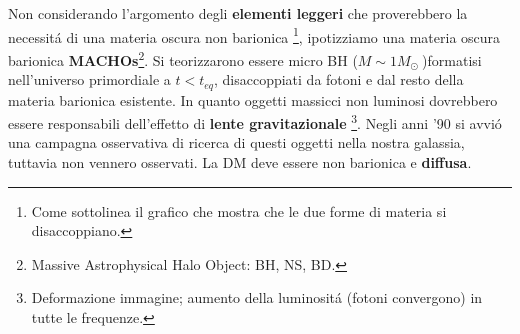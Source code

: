 \documentclass[12pt, a4paper]{article}
\begin{document}
Non considerando l'argomento degli \textbf{elementi leggeri} che proverebbero la necessit\'{a} di una materia oscura non barionica \footnote{Come sottolinea il grafico che mostra che le due forme di materia si disaccoppiano.}, ipotizziamo una materia oscura barionica \textbf{MACHOs}\footnote{Massive Astrophysical Halo Object: BH, NS, BD.}. Si teorizzarono essere micro BH ($M\sim 1 M_\odot\ $)formatisi nell'universo primordiale a $ t<t_{eq}$, disaccoppiati da fotoni e dal resto della materia barionica esistente. In quanto oggetti massicci non luminosi dovrebbero essere responsabili dell'effetto di \textbf{lente gravitazionale} \footnote{Deformazione immagine; aumento della luminosit\'{a} (fotoni convergono) in tutte le frequenze.}. Negli anni '90 si avvi\'{o} una campagna osservativa di ricerca di questi oggetti nella nostra galassia, tuttavia non vennero osservati. La DM deve essere non barionica e \textbf{diffusa}.
\end{document}
